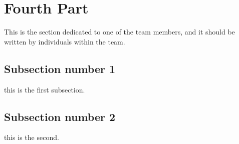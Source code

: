 \documentclass[../main/main.tex]{subfiles}
\begin{document}
\section{Fourth Part}
This is the section dedicated to one of the team members, and it should be written by individuals within the team. 

\subsection{Subsection number 1}
this is the first subsection.

\subsection{Subsection number 2}
this is the second.
\end{document}
